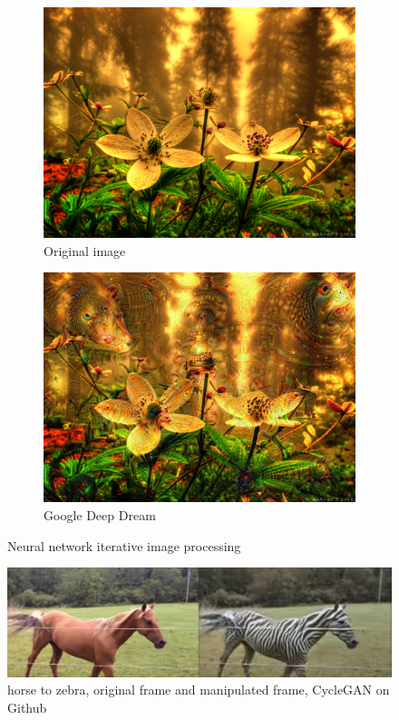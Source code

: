 \documentclass{UIdahoMastersThesis}
\begin{document}
\begin{figure}[h!]
  \centering
  \begin{subfigure}[b]{0.4\linewidth}
    \includegraphics[width=\linewidth]{predeep.jpg}
    \caption{Original image}
  \end{subfigure}
  \begin{subfigure}[b]{0.4\linewidth}
    \includegraphics[width=\linewidth]{deep.jpg}
    \caption{Google Deep Dream}
  \end{subfigure}
  \caption{Neural network iterative image processing}
  \label{fig:deep}
\end{figure}

\begin{figure}[h!]
	\centering
	\includegraphics[width=0.81\linewidth]{gan.png}
	\caption{horse to zebra, original frame and manipulated frame, CycleGAN on Github}
	\label{fig:gan}
\end{figure}
\end{document}
